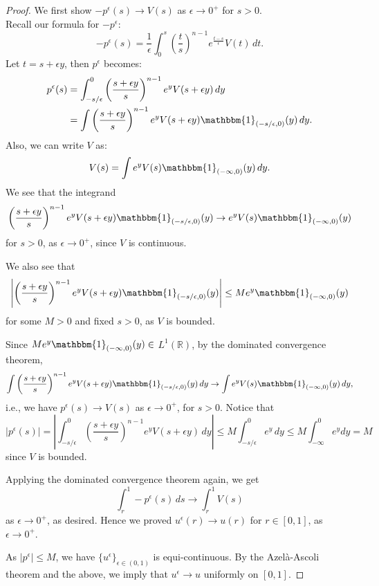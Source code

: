 \documentclass[12pt,reqno]{amsart}
\numberwithin{figure}{section}
\theoremstyle{plain}
\numberwithin{equation}{section}
\begin{document}
\begin{proof}
We first show $-p^{\epsilon}(s)\rightarrow V(s)$ as $\epsilon\rightarrow 0^+$ for $s>0$.\\
Recall our formula for $-p^{\epsilon}$:
\[ 
-p^{\epsilon}(s)= \frac{1}{\epsilon}\int_{0}^{s} \left(\frac{t}{s}\right)^{n-1}e^{\frac{t-s}{\epsilon}}V(t)\,dt.
\] 
Let $t=s+\epsilon y$, then $p^{\epsilon}$ becomes:
\begin{equation*}
\begin{aligned}
    p^{\epsilon}(s) &= \int_{-s/\epsilon}^0\left(\frac{s+\epsilon y}{s}\right)^{n-1}e^y V(s+\epsilon y)\, dy\\
                &= \int \left(\frac{s+\epsilon y}{s}\right)^{n-1}e^y V(s+\epsilon y) \mathbbm{1}_{(-s/\epsilon,0)}(y)\, dy.
\end{aligned}
\end{equation*}
Also, we can write $V$ as:
\[
    V(s) = \int e^y V(s) \mathbbm{1}_{(-\infty,0)} (y)\, dy.
\]
We see that the integrand 
\[
    \left(\frac{s+\epsilon y}{s}\right)^{n-1}e^y V(s+\epsilon y) \mathbbm{1}_{(-s/\epsilon,0)}(y) \rightarrow e^y V(s) \mathbbm{1}_{(-\infty,0)} (y) 
\]
for $s>0$, as $\epsilon \rightarrow 0^+$, since $V$ is continuous. 

We also see that
\[
    \left|\left(\frac{s+\epsilon y}{s}\right)^{n-1}e^y V(s+\epsilon y) \mathbbm{1}_{(-s/\epsilon,0)}(y)\right| \le Me^y \mathbbm{1}_{(-\infty,0)}(y)              
\]
for some $M>0$ and fixed $s>0$, as $V$ is bounded. 

Since $ Me^y \mathbbm{1}_{(-\infty,0)}(y)\in$ $L^1 (\mathbb{R})$, by the dominated convergence theorem,
\[
    \int \left(\frac{s+\epsilon y}{s}\right)^{n-1}e^y V(s+\epsilon y) \mathbbm{1}_{(-s/\epsilon,0)}(y)\, dy \rightarrow \int e^y V(s)\mathbbm{1}_{(-\infty,0)}(y)\, dy,
\]
i.e., we have $p^{\epsilon}(s)\rightarrow V(s)$ as $\epsilon \rightarrow 0^+$, for $s>0$.
Notice that 
\[
    |p^{\epsilon}(s)| = \left|\int_{-s/\epsilon}^0\left(\frac{s+\epsilon y}{s}\right)^{n-1}e^y V(s+\epsilon y)\, dy\right|\le M\int_{-s/\epsilon}^0 e^y \, dy \le M \int_{-\infty}^0 e^y dy=M
\]
since $V$ is bounded. 

Applying the dominated convergence theorem again, we get 
\[
    \int_r^1 -p^{\epsilon}(s)\, ds \rightarrow \int_r^1 V(s)
\]
as $\epsilon \rightarrow 0^+$, as desired.
Hence we proved $u^{\epsilon}(r) \rightarrow u(r)$ for $r\in [0,1]$, as $\epsilon \rightarrow 0^+$.

As $|p^{\epsilon}|\le M$, we have $\{u^{\epsilon}\}_{\epsilon \in (0,1)}$ is equi-continuous. By the Azel\`{a}-Ascoli theorem and the above, we imply that $u^{\epsilon}\rightarrow u$ uniformly on $[0,1]$.
\end{proof}
\end{document}
